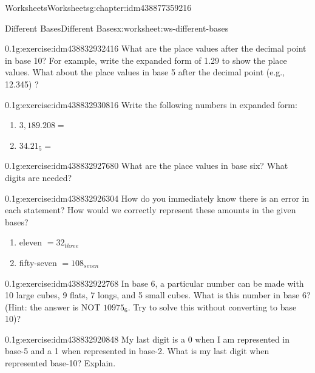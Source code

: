 \documentclass[twoside,11pt,]{book}
\begin{document}
\begin{chapterptx}{Worksheets}{}{Worksheets}{}{}{g:chapter:idm438877359216}
\begin{worksheet-section-numberless}{Different Bases}{}{Different Bases}{}{}{x:worksheet:ws-different-bases}
\begin{divisionexercise}{2}{}{0.1}{g:exercise:idm438832932416}
What are the place values after the decimal point in base 10? For example, write the expanded form of 1.29 to show the place values. What about the place values in base 5 after the decimal point (e.g., 12.345) ?%
\end{divisionexercise}%
\begin{divisionexercise}{3}{}{0.1}{g:exercise:idm438832930816}%
Write the following numbers in expanded form:%
\leavevmode%
\begin{enumerate}[label=(\alph*)]
\item{}\(3,189.208 = \)%
\item{}\(34.21_5      = \)%
\end{enumerate}
\end{divisionexercise}%
\begin{divisionexercise}{4}{}{0.1}{g:exercise:idm438832927680}%
What are the place values in base six?  What digits are needed?%
\end{divisionexercise}%
\begin{divisionexercise}{5}{}{0.1}{g:exercise:idm438832926304}%
How do you immediately know there is an error in each statement?  How would we correctly represent these amounts in the given bases?%
\leavevmode%
\begin{enumerate}[label=(\alph*)]
\item{}eleven \(= 32_{three}\)%
\item{}fifty-seven \(= 108_{seven}\)%
\end{enumerate}
\end{divisionexercise}%
\begin{divisionexercise}{6}{}{0.1}{g:exercise:idm438832922768}%
In base 6, a particular number can be made with 10 large cubes, 9 flats, 7 longs, and 5 small cubes.  What is this number in base 6? (Hint: the answer is NOT \(10975_6 \). Try to solve this without converting to base 10)?%
\end{divisionexercise}%
\begin{divisionexercise}{7}{}{0.1}{g:exercise:idm438832920848}%
My last digit is a 0 when I am represented in base-5 and a 1 when represented in base-2.  What is my last digit when represented base-10? Explain.%
\end{divisionexercise}%
\end{worksheet-section-numberless}
\restoregeometry
%
%
\typeout{************************************************}
\typeout{************************************************}
%

\end{chapterptx}
\end{document}
